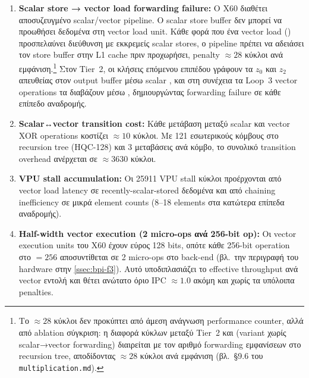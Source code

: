 \begin{enumerate}
  \item \textbf{Scalar store → vector load forwarding failure:} Ο X60
    διαθέτει αποσυζευγμένο scalar/vector pipeline. Ο scalar store buffer
    δεν μπορεί να προωθήσει δεδομένα στη vector load unit. Κάθε φορά
    που ένα vector load () προσπελαύνει διεύθυνση με
    εκκρεμείς scalar stores, ο pipeline πρέπει να αδειάσει τον store
    buffer στην L1 cache πριν προχωρήσει, penalty $\approx \num{28}$
    κύκλοι ανά εμφάνιση.\footnote{Το $\approx\num{28}$ κύκλοι δεν προκύπτει
    από άμεση ανάγνωση performance counter, αλλά από ablation σύγκριση:
    η διαφορά κύκλων μεταξύ Tier~2 και 
    (variant χωρίς scalar→vector forwarding) διαιρείται με τον αριθμό
    forwarding εμφανίσεων στο recursion tree, αποδίδοντας
    $\approx\num{28}$ κύκλοι ανά εμφάνιση (βλ.\ §9.6 του
    \texttt{multiplication.md}).}
    Στον Tier~2, οι κλήσεις επόμενου επιπέδου γράφουν τα $z_0$
    και $z_2$ απευθείας στον output buffer μέσω scalar , και στη
    συνέχεια τα Loop~3 vector operations τα διαβάζουν μέσω ,
    δημιουργώντας forwarding failure σε κάθε επίπεδο αναδρομής.

  \item \textbf{Scalar↔vector transition cost:} Κάθε μετάβαση μεταξύ
    scalar  και vector XOR operations κοστίζει
    $\approx \num{10}$ κύκλοι. Με \num{121} εσωτερικούς κόμβους στο
    recursion tree (HQC-128) και \num{3} μεταβάσεις ανά κόμβο, το
    συνολικό transition overhead ανέρχεται σε $\approx \num{3630}$ κύκλοι.

  \item \textbf{VPU stall accumulation:} Οι \num{25911} VPU stall κύκλοι
    προέρχονται από vector load latency σε recently-scalar-stored
    δεδομένα και από chaining inefficiency σε μικρά element counts
    (8–18 elements στα κατώτερα επίπεδα αναδρομής).

  \item \textbf{Half-width vector execution (2 micro-ops ανά \num{256}-bit op):}
    Οι vector execution units του X60 έχουν εύρος \num{128} bits, οπότε
    κάθε \num{256}-bit \RVV operation στο \VLEN$= \num{256}$ αποσυντίθεται
    σε \num{2} micro-ops στο back-end (βλ.\ την περιγραφή του hardware στην
    \cref{ssec:bpi-f3}). Αυτό υποδιπλασιάζει το effective throughput ανά
    vector εντολή και θέτει ανώτατο όριο IPC $\approx 1.0$ ακόμη και χωρίς
    τα υπόλοιπα penalties.
\end{enumerate}

